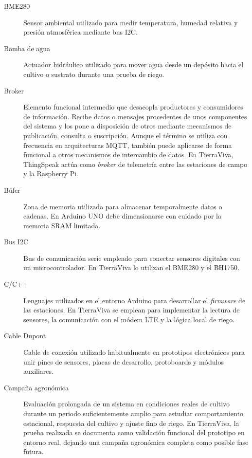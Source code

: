 \begin{description}
    \item[BME280]
    Sensor ambiental utilizado para medir temperatura, humedad relativa y presión atmosférica mediante bus I2C.

    \item[Bomba de agua]
    Actuador hidráulico utilizado para mover agua desde un depósito hacia el cultivo o sustrato durante una prueba de riego.

    \item[Broker]
    Elemento funcional intermedio que desacopla productores y consumidores de información. Recibe datos o mensajes procedentes de unos componentes del sistema y los pone a disposición de otros mediante mecanismos de publicación, consulta o suscripción. Aunque el término se utiliza con frecuencia en arquitecturas MQTT, también puede aplicarse de forma funcional a otros mecanismos de intercambio de datos. En TierraViva, ThingSpeak actúa como \textit{broker} de telemetría entre las estaciones de campo y la Raspberry Pi.

    \item[Búfer]
    Zona de memoria utilizada para almacenar temporalmente datos o cadenas. En Arduino UNO debe dimensionarse con cuidado por la memoria SRAM limitada. 

    \item[Bus I2C]
    Bus de comunicación serie empleado para conectar sensores digitales con un microcontrolador. En TierraViva lo utilizan el BME280 y el BH1750.

    \item[C/C++]
    Lenguajes utilizados en el entorno Arduino para desarrollar el \textit{firmware} de las estaciones. En TierraViva se emplean para implementar la lectura de sensores, la comunicación con el módem LTE y la lógica local de riego.

    \item[Cable Dupont]
    Cable de conexión utilizado habitualmente en prototipos electrónicos para unir pines de sensores, placas de desarrollo, protoboards y módulos auxiliares.

    \item[Campaña agronómica]
    Evaluación prolongada de un sistema en condiciones reales de cultivo durante un periodo suficientemente amplio para estudiar comportamiento estacional, respuesta del cultivo y ajuste fino de riego. En TierraViva, la prueba realizada se documenta como validación funcional del prototipo en entorno real, dejando una campaña agronómica completa como posible fase futura.


\end{description}
